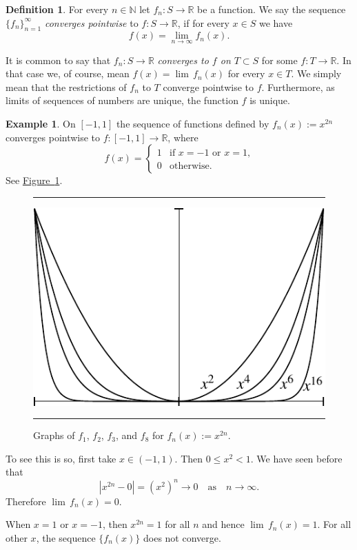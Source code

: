 \documentclass[12pt]{book}
\newenvironment{myfigureht}{%
\begin{figure}[h!t]
\noindent\rule{\textwidth}{0.4pt}\vspace{12pt}\par\centering}%
{\par\noindent\rule{\textwidth}{0.4pt}
\end{figure}}
\newcommand{\abs}[1]{\left\lvert {#1} \right\rvert}
\newcommand{\R}{{\mathbb{R}}}
\newcommand{\N}{{\mathbb{N}}}
\newcommand{\myindex}[1]{#1\index{#1}}
\theoremstyle{plain}
\theoremstyle{remark}
\theoremstyle{definition}
\newtheorem{defn}[thm]{Definition}
\theoremstyle{exercise}
\theoremstyle{example}
\newtheorem{example}[thm]{Example}
\newcommand{\figureref}[1]{\hyperref[#1]{Figure~\ref*{#1}}}
\begin{document}
\begin{defn}
For every $n \in \N$
let $f_n \colon S \to \R$ be a function.  We say the sequence
$\{ f_n \}_{n=1}^\infty$
\emph{\myindex{converges pointwise}} to $f \colon S \to \R$, if for every $x
\in S$
we have
\begin{equation*}
f(x) =
\lim_{n\to\infty} f_n(x) .
\end{equation*}
\end{defn}

It is common to say that $f_n \colon S \to \R$
\emph{converges to $f$ on $T \subset S$}
for some $f \colon T \to \R$.  In that case we, of course, mean 
$f(x) = \lim\, f_n(x)$ for every $x \in T$.  We simply mean that the
restrictions of $f_n$ to $T$ converge pointwise to $f$.
Furthermore,
as limits of sequences of numbers are unique, the function $f$ is unique.

\begin{example}
On $[-1,1]$ the sequence of functions defined by $f_n(x) := x^{2n}$
converges pointwise to $f \colon [-1,1] \to \R$, where
\begin{equation*}
f(x) =
\begin{cases}
1 & \text{if $x=-1$ or $x=1$,} \\
0 & \text{otherwise.}
\end{cases}
\end{equation*}
See \figureref{x2nfig}.

\begin{myfigureht}
\includegraphics{figures/x2nfig}
\caption{Graphs of $f_1$, $f_2$, $f_3$, and $f_8$ for $f_n(x) :=
x^{2n}$.\label{x2nfig}}
\end{myfigureht}

To see this is so, first take $x \in (-1,1)$.  Then 
$0 \leq x^2 < 1$.
We have seen before that
\begin{equation*}
\abs{x^{2n} - 0} = {(x^2)}^n \to 0 \quad \text{as} \quad n \to \infty .
\end{equation*}
Therefore $\lim\,f_n(x) = 0$.

When $x = 1$ or $x=-1$, then $x^{2n} = 1$ for all $n$ and hence
$\lim\,f_n(x) = 1$.
For all other $x$, the sequence
$\{ f_n(x) \}$ does not converge.
\end{example}
\end{document}
